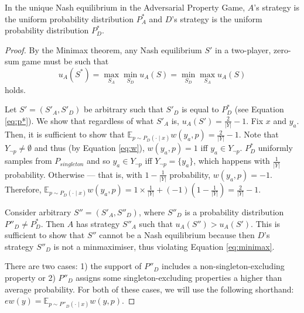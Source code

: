 \begin{theorem} \label{thm:ne}
In the unique Nash equilibrium in the Adversarial Property Game, $A$'s strategy is the uniform probability distribution $P^*_A$ and $D$'s strategy is the uniform probability distribution $P^*_D$.
\end{theorem}
\begin{proof}
By the Minimax theorem, %
any Nash equilibrium $S'$ in a two-player, zero-sum game must be such that 
\begin{equation} \label{eq:minimax}
u_A(S^*) = \max_{S_A} \min_{S_D} u_A(S) = \min_{S_D} \max_{S_A} u_A(S)
\end{equation}
holds.

Let $S' = (S'_A, S'_D)$ be arbitrary such that $S'_D$ is equal to $P^*_D$ (see Equation \ref{eq:p*}). We show that regardless of what $S'_A$ is, $u_A(S') = \frac{2}{|Y|} - 1$. Fix $x$ and $y_a$. Then, it is sufficient to show that $\mathbb{E}_{p \sim P_D(\cdot \mid x)}w(y_a, p) = \frac{2}{|Y|} - 1$. Note that $Y_{\neg p} \ne \emptyset$ and thus (by Equation \ref{eq:w}), $w(y_a, p) = 1$ iff $y_a \in Y_{\neg p}$. $P^*_D$ uniformly samples from $P_\mathit{singleton}$ and so $y_a \in Y_{\neg p}$ iff $Y_\mathit{\neg p} =\{y_a\}$, which happens with $\frac{1}{|Y|}$ probability. Otherwise --- that is, with $1 - \frac{1}{|Y|}$ probability, $w(y_a, p) = -1$. Therefore, $\mathbb{E}_{p \sim P_D(\cdot \mid x)}w(y_a, p) = 1 \times \frac{1}{|Y|} + (-1) (1- \frac{1}{|Y|}) = \frac{2}{|Y|} - 1$.


Consider arbitrary $S'' = (S'_A, S''_D)$, where $S''_D$ is a probability distribution $P''_D \ne P^*_D$. Then $A$ has strategy $S''_A$ such that $u_A(S'') > u_A(S')$. This is sufficient to show that $S''$ cannot be a Nash equilibrium because then $D$'s strategy $S''_D$ is not a minmaximiser, thus violating Equation \ref{eq:minimax}.  %

There are two cases: 1) the support of $P''_D$ includes a non-singleton-excluding property or 2) $P''_D$ assigns some singleton-excluding properties a higher than average probability. %
For both of these cases, we will use the following shorthand: $ew(y) = \mathbb{E}_{p \sim P''_D(\cdot\mid x)} w(y, p)$. 


\end{proof}
